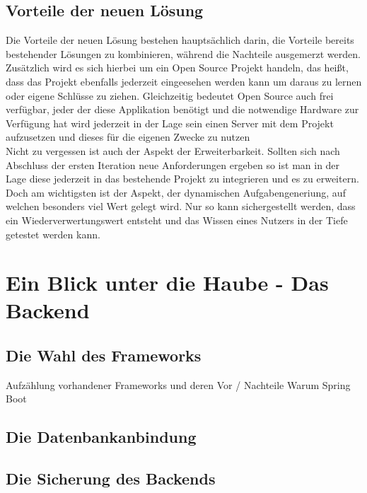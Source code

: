 \section{Vorteile der neuen Lösung}

Die Vorteile der neuen Lösung bestehen hauptsächlich darin, die Vorteile bereits bestehender Lösungen zu kombinieren, während die Nachteile ausgemerzt werden. \\

Zusätzlich wird es sich hierbei um ein Open Source Projekt handeln, das heißt, dass das Projekt ebenfalls jederzeit eingeesehen werden kann um daraus zu lernen oder eigene Schlüsse zu ziehen. Gleichzeitig bedeutet Open Source auch frei verfügbar, jeder der diese Applikation benötigt und die notwendige Hardware zur Verfügung hat wird jederzeit in der Lage sein einen Server mit dem Projekt aufzusetzen und dieses für die eigenen Zwecke zu nutzen \\

Nicht zu vergessen ist auch der Aspekt der Erweiterbarkeit. Sollten sich nach Abschluss der ersten Iteration neue Anforderungen ergeben so ist man in der Lage diese jederzeit in das bestehende Projekt zu integrieren und es zu erweitern. \\

Doch am wichtigsten ist der Aspekt, der dynamischen Aufgabengeneriung, auf welchen besonders viel Wert gelegt wird. Nur so kann sichergestellt werden, dass ein Wiederverwertungswert entsteht und das Wissen eines Nutzers in der Tiefe getestet werden kann.

\chapter{Ein Blick unter die Haube - Das Backend}

\section{Die Wahl des Frameworks}

Aufzählung vorhandener Frameworks und deren Vor / Nachteile
Warum Spring Boot

\section{Die Datenbankanbindung}

\section{Die Sicherung des Backends}


